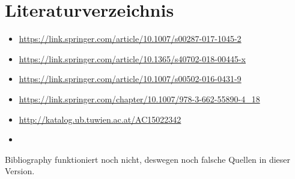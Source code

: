 \documentclass[]{protocol}
\begin{document}


\section{Literaturverzeichnis}
\begin{itemize}
	\item \url{https://link.springer.com/article/10.1007/s00287-017-1045-2}
	\item \url{https://link.springer.com/article/10.1365/s40702-018-00445-x}
	\item \url{https://link.springer.com/article/10.1007/s00502-016-0431-9}
	\item \url{https://link.springer.com/chapter/10.1007/978-3-662-55890-4_18}
	\item \url{http://katalog.ub.tuwien.ac.at/AC15022342}
	
	\item 
\end{itemize}

Bibliography funktioniert noch nicht, deswegen noch falsche Quellen in dieser Version.





\end{document}
